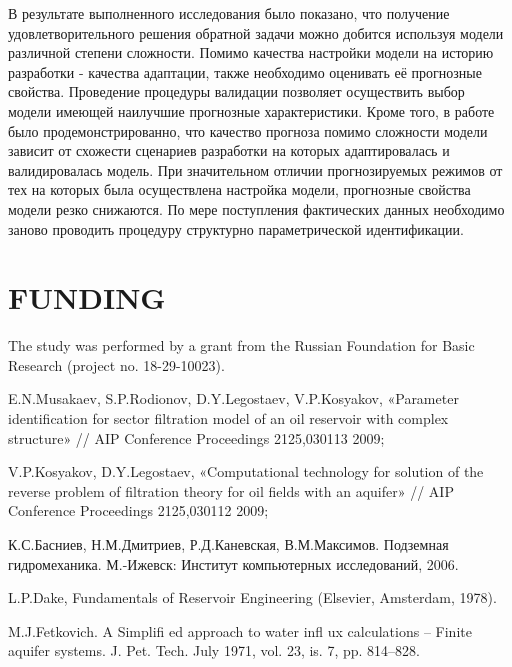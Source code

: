 \documentclass{article}
\begin{document}
В результате выполненного исследования было показано, что получение удовлетворительного решения обратной задачи можно добится используя модели различной степени сложности. Помимо качества настройки модели на историю разработки - качества адаптации, также необходимо оценивать её прогнозные свойства. Проведение процедуры валидации позволяет осуществить выбор модели имеющей наилучшие прогнозные характеристики. Кроме того, в работе было продемонстрированно, что качество прогноза помимо сложности модели зависит от схожести сценариев разработки на которых адаптировалась и валидировалась модель. При  значительном отличии прогнозируемых режимов от тех на которых была осуществлена настройка модели, прогнозные свойства модели резко снижаются. По мере поступления фактических данных необходимо заново проводить процедуру структурно параметрической идентификации.

\section{FUNDING}
The study was performed by a grant from the Russian Foundation for Basic Research (project no. 18-29-10023).

%
%
\begin{thebibliography}{99}
 E.N.Musakaev, S.P.Rodionov, D.Y.Legostaev, V.P.Kosyakov,  «Parameter identification for sector filtration model of an oil reservoir with complex structure» // AIP Conference Proceedings 2125,030113 2009;

 V.P.Kosyakov, D.Y.Legostaev,  «Computational technology for solution of the reverse problem of filtration theory for oil fields with an aquifer» // AIP Conference Proceedings 2125,030112 2009;

 К.С.Басниев, Н.М.Дмитриев, Р.Д.Каневская, В.М.Максимов. Подземная гидромеханика.  М.-Ижевск: Институт компьютерных исследований, 2006. 

 L.P.Dake, Fundamentals of Reservoir Engineering (Elsevier, Amsterdam, 1978).

 M.J.Fetkovich. A Simplifi ed approach to water infl ux calculations – Finite aquifer systems. J. Pet. Tech. July 1971, vol. 23, is. 7, pp. 814–828.


\end{thebibliography}
\end{document}

